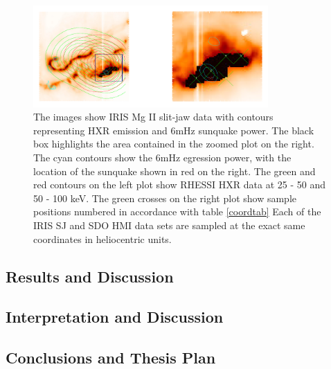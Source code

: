 \begin{figure}[H]
  \begin{center}
  \includegraphics[width=0.8\textwidth]{29-Mar-14-MGII-Sunquake-Context-Plots-xx-Zoom-crop}
  \end{center}
  \caption{The images show IRIS Mg II slit-jaw data with contours representing HXR emission and 6mHz sunquake power. The black box highlights the area contained in the zoomed plot on the right. The cyan contours show the 6mHz egression power, with the location of the sunquake shown in red on the right. The green and red contours on the left plot show RHESSI HXR data at 25 - 50 and 50 - 100 keV. The green crosses on the right plot show sample positions numbered in accordance with table \ref{coordtab} Each of the IRIS SJ and SDO HMI data sets are sampled at the exact same coordinates in heliocentric units.}\label{mgrib}
\end{figure}


\subsection{Results and Discussion}
\subsection{Interpretation and Discussion}

\subsection{Conclusions and Thesis Plan}




